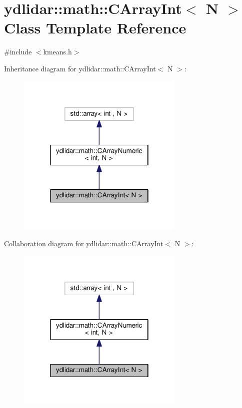 \hypertarget{classydlidar_1_1math_1_1_c_array_int}{}\section{ydlidar\+:\+:math\+:\+:C\+Array\+Int$<$ N $>$ Class Template Reference}
\label{classydlidar_1_1math_1_1_c_array_int}


{\ttfamily \#include $<$kmeans.\+h$>$}



Inheritance diagram for ydlidar\+:\+:math\+:\+:C\+Array\+Int$<$ N $>$\+:
\nopagebreak
\begin{figure}[H]
\begin{center}
\leavevmode
\includegraphics[width=226pt]{classydlidar_1_1math_1_1_c_array_int__inherit__graph}
\end{center}
\end{figure}


Collaboration diagram for ydlidar\+:\+:math\+:\+:C\+Array\+Int$<$ N $>$\+:
\nopagebreak
\begin{figure}[H]
\begin{center}
\leavevmode
\includegraphics[width=226pt]{classydlidar_1_1math_1_1_c_array_int__coll__graph}
\end{center}
\end{figure}
